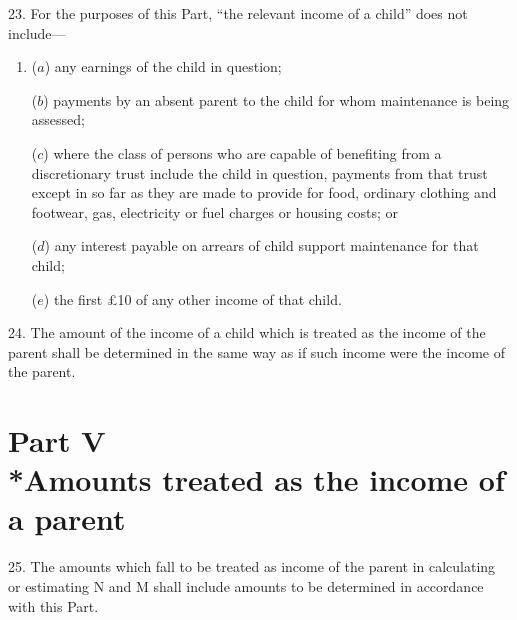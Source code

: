 \documentclass[12pt,a4paper]{article}
\begin{document}
23.  For the purposes of this Part, “the relevant income of a child” does not include—
\begin{enumerate}\item[]
($a$) any earnings of the child in question;

($b$) payments by an absent parent 
to  %
the child for whom maintenance is being assessed;

($c$) where the class of persons who are capable of benefiting from a discretionary trust include the child in question, payments from that trust except in so far as they are made to provide for food, ordinary clothing and footwear, gas, electricity or fuel charges or housing costs; or

($d$) any interest payable on arrears of child support maintenance for that child;

($e$) the first £10 of any other income of that child.
\end{enumerate}


\medskip

24.  The amount of the income of a child which is treated as the income of the parent shall be determined in the same way as if such income were the income of the parent.

\section[Part V --- Amounts treated as the income of a parent]{Part V\\*Amounts treated as the income of a parent}

\renewcommand\parthead{--- Schedule 1 Part V}

25.  The amounts which fall to be treated as income of the parent in calculating or estimating N and M shall include amounts to be determined in accordance with this Part.

\medskip
\end{document}
